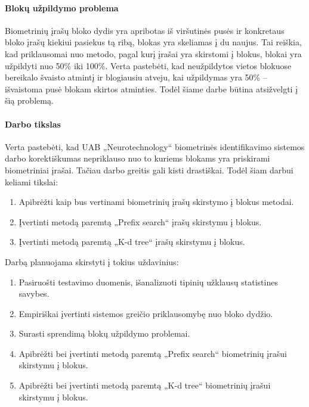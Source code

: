 \paragraph{Blokų užpildymo problema}

Biometrinių įrašų bloko dydis yra apribotas iš viršutinės pusės ir konkretaus bloko įrašų kiekiui pasiekus tą ribą, blokas yra skeliamas į du naujus.
Tai reiškia, kad priklausomai nuo metodo, pagal kurį įrašai yra skirstomi į blokus, blokai yra užpildyti nuo 50\% iki 100\%.
Verta pastebėti, kad neužpildytos vietos blokuose bereikalo švaisto atmintį ir blogiausiu atveju, kai užpildymas yra 50\% -- išvaistoma pusė blokam skirtos atminties.
Todėl šiame darbe būtina atsižvelgti į šią problemą.

\paragraph{Darbo tikslas}

Verta pastebėti, kad UAB „Neurotechnology“ biometrinės identifikavimo sistemos darbo korektiškumas nepriklauso nuo to kuriems blokams yra priskirami biometriniai įrašai.
Tačiau darbo greitis gali kisti drastiškai.
Todėl šiam darbui keliami tikslai:
\begin{enumerate}
	\item Apibrėžti kaip bus vertinami biometrinių įrašų skirstymo į blokus metodai.
	\item Įvertinti metodą paremtą „Prefix search“ įrašų skirstymu į blokus.
	\item Įvertinti metodą paremtą „K-d tree“ įrašų skirstymu į blokus.
\end{enumerate}

Darbą planuojama skirstyti į tokius uždavinius:

\begin{enumerate}
	\item Pasiruošti testavimo duomenis, išanalizuoti tipinių užklausų statistines savybes.
	\item Empiriškai įvertinti sistemos greičio priklausomybę nuo bloko dydžio.
	\item Surasti sprendimą blokų užpildymo problemai.
	\item Apibrėžti bei įvertinti metodą paremtą „Prefix search“ biometrinių įrašui skirstymu į blokus.
	\item Apibrėžti bei įvertinti metodą paremtą „K-d tree“ biometrinių įrašui skirstymu į blokus.
\end{enumerate}


